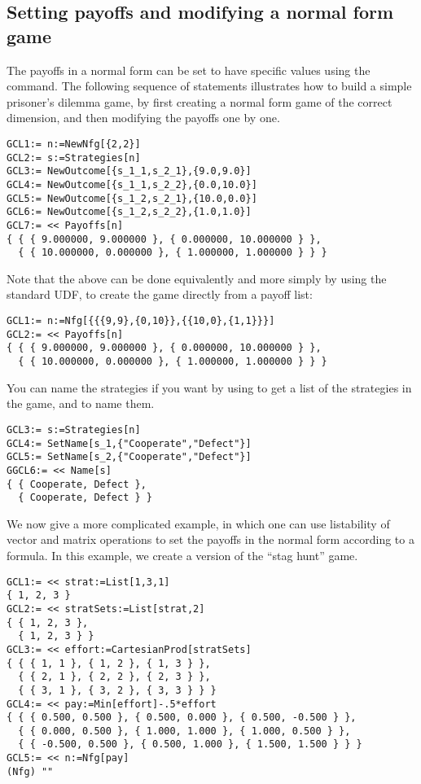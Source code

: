 \subsection{Setting payoffs and modifying a normal form
game}  

The payoffs in a normal form can be set to have specific values using
the  command.  The following sequence of statements
illustrates how to build a simple prisoner's dilemma game, by first
creating a normal form game of the correct dimension, and then
modifying the payoffs one by one.  

\begin{verbatim}
GCL1:= n:=NewNfg[{2,2}]
GCL2:= s:=Strategies[n]
GCL3:= NewOutcome[{s_1_1,s_2_1},{9.0,9.0}]
GCL4:= NewOutcome[{s_1_1,s_2_2},{0.0,10.0}]
GCL5:= NewOutcome[{s_1_2,s_2_1},{10.0,0.0}]
GCL6:= NewOutcome[{s_1_2,s_2_2},{1.0,1.0}]
GCL7:= << Payoffs[n]
{ { { 9.000000, 9.000000 }, { 0.000000, 10.000000 } },
  { { 10.000000, 0.000000 }, { 1.000000, 1.000000 } } }
\end{verbatim}

Note that the above can be done equivalently and more simply by using
the standard UDF,  to create the game directly from a payoff
list:

\begin{verbatim}
GCL1:= n:=Nfg[{{{9,9},{0,10}},{{10,0},{1,1}}}]
GCL2:= << Payoffs[n]
{ { { 9.000000, 9.000000 }, { 0.000000, 10.000000 } },
  { { 10.000000, 0.000000 }, { 1.000000, 1.000000 } } }
\end{verbatim}

\noindent
You can name the strategies if you want by using  to
get a list of the strategies in the game, and  to name
them.

\begin{verbatim}
GCL3:= s:=Strategies[n]
GCL4:= SetName[s_1,{"Cooperate","Defect"}]
GCL5:= SetName[s_2,{"Cooperate","Defect"}]
GGCL6:= << Name[s]
{ { Cooperate, Defect },
  { Cooperate, Defect } }
\end{verbatim}

We now give a more complicated example, in which one can use
listability of vector and matrix operations to set the payoffs in the
normal form according to a formula.  In this example, we create a
version of the ``stag hunt'' game.

\begin{verbatim}
GCL1:= << strat:=List[1,3,1]
{ 1, 2, 3 }
GCL2:= << stratSets:=List[strat,2]
{ { 1, 2, 3 },
  { 1, 2, 3 } }
GCL3:= << effort:=CartesianProd[stratSets] 
{ { { 1, 1 }, { 1, 2 }, { 1, 3 } },
  { { 2, 1 }, { 2, 2 }, { 2, 3 } },
  { { 3, 1 }, { 3, 2 }, { 3, 3 } } }
GCL4:= << pay:=Min[effort]-.5*effort
{ { { 0.500, 0.500 }, { 0.500, 0.000 }, { 0.500, -0.500 } },
  { { 0.000, 0.500 }, { 1.000, 1.000 }, { 1.000, 0.500 } },
  { { -0.500, 0.500 }, { 0.500, 1.000 }, { 1.500, 1.500 } } }
GCL5:= << n:=Nfg[pay]
(Nfg) ""
\end{verbatim}

